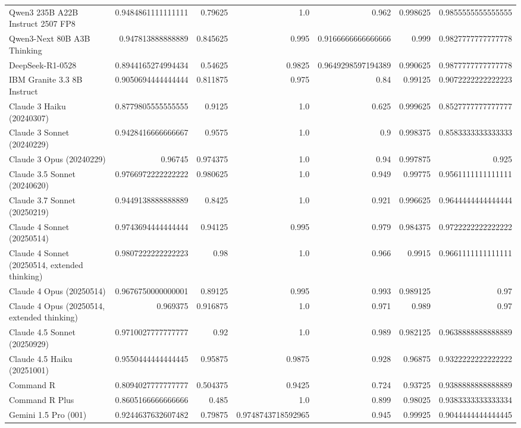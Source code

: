 \begin{table}[htp]
{\begin{tabular}{lrrrrrr}
Qwen3 235B A22B Instruct 2507 FP8 & 0.9484861111111111 & 0.79625 & 1.0 & 0.962 & 0.998625 & 0.9855555555555555 \\
Qwen3-Next 80B A3B Thinking & 0.947813888888889 & 0.845625 & 0.995 & 0.9166666666666666 & 0.999 & 0.9827777777777778 \\
DeepSeek-R1-0528 & 0.8944165274994434 & 0.54625 & 0.9825 & 0.9649298597194389 & 0.990625 & 0.9877777777777778 \\
IBM Granite 3.3 8B Instruct & 0.9050694444444444 & 0.811875 & 0.975 & 0.84 & 0.99125 & 0.9072222222222223 \\
Claude 3 Haiku (20240307) & 0.8779805555555555 & 0.9125 & 1.0 & 0.625 & 0.999625 & 0.8527777777777777 \\
Claude 3 Sonnet (20240229) & 0.9428416666666667 & 0.9575 & 1.0 & 0.9 & 0.998375 & 0.8583333333333333 \\
Claude 3 Opus (20240229) & 0.96745 & 0.974375 & 1.0 & 0.94 & 0.997875 & 0.925 \\
Claude 3.5 Sonnet (20240620) & 0.9766972222222222 & 0.980625 & 1.0 & 0.949 & 0.99775 & 0.9561111111111111 \\
Claude 3.7 Sonnet (20250219) & 0.9449138888888889 & 0.8425 & 1.0 & 0.921 & 0.996625 & 0.9644444444444444 \\
Claude 4 Sonnet (20250514) & 0.9743694444444444 & 0.94125 & 0.995 & 0.979 & 0.984375 & 0.9722222222222222 \\
Claude 4 Sonnet (20250514, extended thinking) & 0.9807222222222223 & 0.98 & 1.0 & 0.966 & 0.9915 & 0.9661111111111111 \\
Claude 4 Opus (20250514) & 0.9676750000000001 & 0.89125 & 0.995 & 0.993 & 0.989125 & 0.97 \\
Claude 4 Opus (20250514, extended thinking) & 0.969375 & 0.916875 & 1.0 & 0.971 & 0.989 & 0.97 \\
Claude 4.5 Sonnet (20250929) & 0.9710027777777777 & 0.92 & 1.0 & 0.989 & 0.982125 & 0.9638888888888889 \\
Claude 4.5 Haiku (20251001) & 0.9550444444444445 & 0.95875 & 0.9875 & 0.928 & 0.96875 & 0.9322222222222222 \\
Command R & 0.8094027777777777 & 0.504375 & 0.9425 & 0.724 & 0.93725 & 0.9388888888888889 \\
Command R Plus & 0.8605166666666666 & 0.485 & 1.0 & 0.899 & 0.98025 & 0.9383333333333334 \\
Gemini 1.5 Pro (001) & 0.9244637632607482 & 0.79875 & 0.9748743718592965 & 0.945 & 0.99925 & 0.9044444444444445 \\

\end{tabular}}
\end{table}
